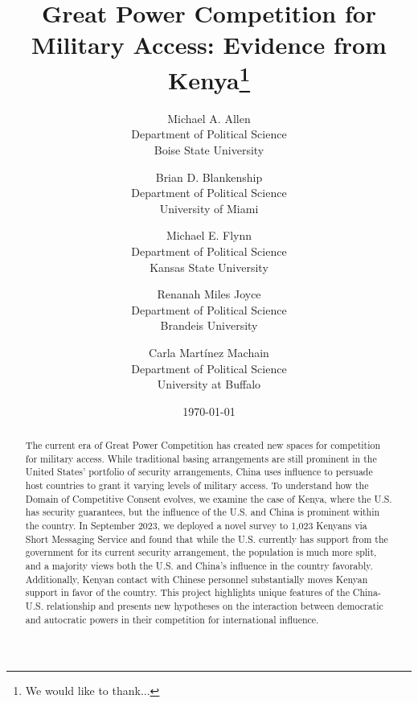 \documentclass[12pt]{article}
\begin{document}
\author{Michael A. Allen \\ Department of Political Science \\ Boise State University \and Brian D. Blankenship \\Department of Political Science\\University of Miami \and Michael E. Flynn \\ Department of Political Science \\ Kansas State University \and Renanah Miles Joyce \\ Department of Political Science \\ Brandeis University \and Carla Mart\'{i}nez Machain \\ Department of Political Science \\ University at Buffalo}
\title{Great Power Competition for Military Access: Evidence from Kenya\footnote{We would like to thank...}}

\date{\vspace{2em}\today \vspace{1em}}

\maketitle

\thispagestyle{empty}

\clearpage

\begin{abstract}
\noindent 

The current era of Great Power Competition has created new spaces for competition for military access. While traditional basing arrangements are still prominent in the United States' portfolio of security arrangements, China uses influence to persuade host countries to grant it varying levels of military access. To understand how the Domain of Competitive Consent evolves, we examine the case of Kenya, where the U.S. has security guarantees, but the influence of the U.S. and China is prominent within the country. In September 2023, we deployed a novel survey to 1,023 Kenyans via Short Messaging Service and found that while the U.S. currently has support from the government for its current security arrangement, the population is much more split, and a majority views both the U.S. and China's influence in the country favorably. Additionally, Kenyan contact with Chinese personnel substantially moves Kenyan support in favor of the country. This project highlights unique features of the China-U.S. relationship and presents new hypotheses on the interaction between democratic and autocratic powers in their competition for international influence.
\end{abstract}




	\vfill
	
	\thispagestyle{empty}
	
	
	\newpage
\setcounter{page}{1}

\doublespacing
	
	
	
	
	

\newpage



\end{document}
